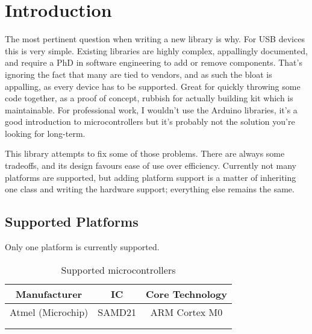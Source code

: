\chapter{Introduction}
The most pertinent question when writing a new library is why. For USB devices this is very simple. Existing libraries are highly complex, appallingly documented, and require a PhD in software engineering to add or remove components. That's ignoring the fact that many are tied to vendors, and as such the bloat is appalling, as every device has to be supported. Great for quickly throwing some code together, as a proof of concept, rubbish for actually building kit which is maintainable. For professional work, I wouldn't use the Arduino libraries, it's a good introduction to microcontrollers but it's probably not the solution you're looking for long-term.

This library attempts to fix some of those problems. There are always some tradeoffs, and its design favours ease of use over efficiency. Currently not many platforms are supported, but adding platform support is a matter of inheriting one class and writing the hardware support; everything else remains the same.

\section{Supported Platforms}

Only one platform is currently supported.

\begin{longtable}{ c c c }
Manufacturer & IC & Core Technology \\
\endhead
Atmel (Microchip) & SAMD21 & ARM Cortex M0 \\
& & \\
\caption{Supported microcontrollers}
\end{longtable}
